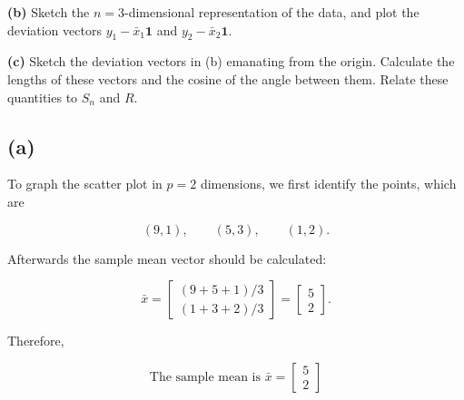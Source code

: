 \documentclass{article}
\begin{document}
\vspace{0.2cm}

\noindent
\textbf{(b)} Sketch the $n=3$-dimensional representation of the data,
and plot the deviation vectors $y_1-\bar{x}_1\mathbf{1}$ and
$y_2-\bar{x}_2\mathbf{1}$.

\vspace{0.2cm}

\noindent
\textbf{(c)} Sketch the deviation vectors in (b) emanating from the
origin. Calculate the lengths of these vectors and the cosine of the
angle between them. Relate these quantities to $S_n$ and $R$.

\vspace{0.5cm}


\subsection*{(a)}

To graph the scatter plot in $p=2$ dimensions, we first identify the
points, which are

$$
(9,1),\qquad (5,3),\qquad (1,2).
$$

Afterwards the sample mean vector should be calculated:

$$
\bar{x}
=
\begin{bmatrix}
(9+5+1)/3\\
(1+3+2)/3
\end{bmatrix}
=
\begin{bmatrix}
5\\
2
\end{bmatrix}.
$$

Therefore,

$$
\boxed{
\text{The sample mean is }
\bar{x}
=
\begin{bmatrix}
5\\
2
\end{bmatrix}}
$$

\vspace{0.5cm}
\end{document}
